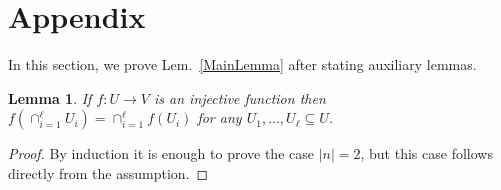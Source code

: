 \documentclass[9pt,twocolumn]{pnas-new}
\newtheorem{lemma}{Lemma}
\begin{document}
\section{Appendix}\label{proofs}

In this section, we prove Lem.~\ref{MainLemma} after stating auxiliary lemmas.%


\begin{lemma}\label{spanIntersectionLemma}
If $f: U \to V$ is an injective function then $f\left(\cap_{i=1}^\ell U_i \right) =  \cap_{i=1}^\ell f\left(U_i\right)$ for any $U_1, \ldots, U_\ell \subseteq U$.
\end{lemma}
\begin{proof}
By induction it is enough to prove the case $|n| = 2$, but this case follows directly from the assumption. %
\end{proof}
\end{document}
